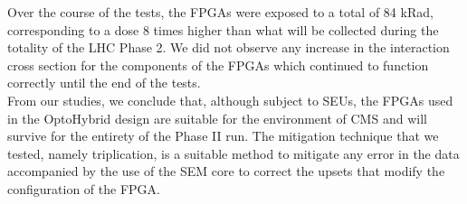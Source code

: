     Over the course of the tests, the FPGAs were exposed to a total of 84 kRad, corresponding to a dose 8 times higher than what will be collected during the totality of the LHC Phase 2. We did not observe any increase in the interaction cross section for the components of the FPGAs which continued to function correctly until the end of the tests. \\

    From our studies, we conclude that, although subject to SEUs, the FPGAs used in the OptoHybrid design are suitable for the environment of CMS and will survive for the entirety of the Phase II run. The mitigation technique that we tested, namely triplication, is a suitable method to mitigate any error in the data accompanied by the use of the SEM core to correct the upsets that modify the configuration of the FPGA.
